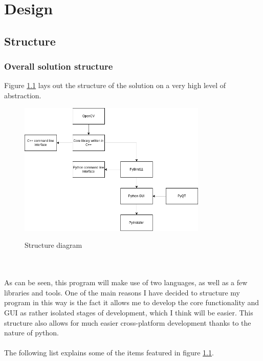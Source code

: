 \documentclass[11pt]{report}
\begin{document}
\chapter{Design}
\thispagestyle{fancy}

\section{Structure}
\subsection{Overall solution structure}
Figure \ref{fig:overallStructure} lays out the structure of the solution on a very high level of abstraction.
\begin{figure}[h!]
	\centering
	\caption{Structure diagram}
	\includegraphics[width=0.8\textwidth]{designDiagrams/overallStructure}
	\label{fig:overallStructure}
\end{figure}\\\\
As can be seen, this program will make use of two languages, as well as a few libraries and tools. One of the main reasons I have decided to structure my program in this way is the fact it allows me to develop the core functionality and GUI as rather isolated stages of development, which I think will be easier. This structure also allows for much easier cross-platform development thanks to the nature of python.\\\\
The following list explains some of the items featured in figure \ref{fig:overallStructure}.
\end{document}
